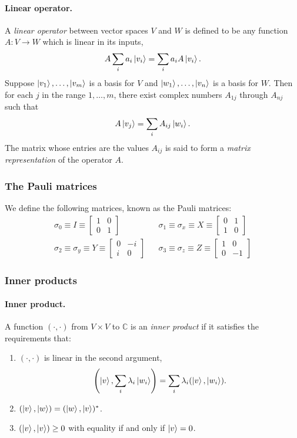 \documentclass{article}
\numberwithin{theorem}{section}
\numberwithin{corollary}{section}
\numberwithin{postulate}{section}
\begin{document}
\paragraph{Linear operator.} A \emph{linear operator} between vector spaces $V$
and $W$ is defined to be any function $A: V \to W$ which is linear in its
inputs, \[
  A\sum_i a_i\ket{v_i} = \sum_i a_iA\ket{v_i}.
\] Suppose $\ket{v_1}, \ldots, \ket{v_m}$ is a basis for $V$ and $\ket{w_1},
\ldots, \ket{v_n}$ is a basis for $W$. Then for each $j$ in the range $1,
\ldots, m$, there exist complex numbers $A_{1j}$ through $A_{nj}$ such that \[
  A\ket{v_j} = \sum_i A_{ij}\ket{w_i}.
\] The matrix whose entries are the values $A_{ij}$ is said to form a
\emph{matrix representation} of the operator $A$.

\subsubsection{The Pauli matrices}

We define the following matrices, known as the Pauli matrices:
\begin{align*}
  \sigma_0 \equiv I \equiv
  \begin{bmatrix}
    1 & 0 \\
    0 & 1
  \end{bmatrix}&
  &\sigma_1 \equiv \sigma_x \equiv X \equiv
  \begin{bmatrix}
    0 & 1 \\
    1 & 0
  \end{bmatrix} \\
  \sigma_2 \equiv \sigma_y \equiv Y \equiv
  \begin{bmatrix}
    0 & -i \\
    i & 0
  \end{bmatrix}&
  &\sigma_3 \equiv \sigma_z \equiv Z \equiv
  \begin{bmatrix}
    1 & 0 \\
    0 & -1
  \end{bmatrix}
\end{align*}

\subsubsection{Inner products}

\paragraph{Inner product.} A function $(\cdot, \cdot)$ from $V \times V$ to
$\mathbb{C}$ is an \emph{inner product} if it satisfies the requirements that:
\begin{enumerate}[(1)]
  \item $(\cdot, \cdot)$ is linear in the second argument, \[
      \left(\ket{v}, \sum_i \lambda_i\ket{w_i}\right)
      = \sum_i \lambda_i(\ket{v}, \ket{w_i}).
    \]
  \item $(\ket{v}, \ket{w}) = (\ket{w}, \ket{v})^*$.
  \item $(\ket{v}, \ket{v}) \geq 0$ with equality if and only if $\ket{v} = 0$.
\end{enumerate}
\end{document}
